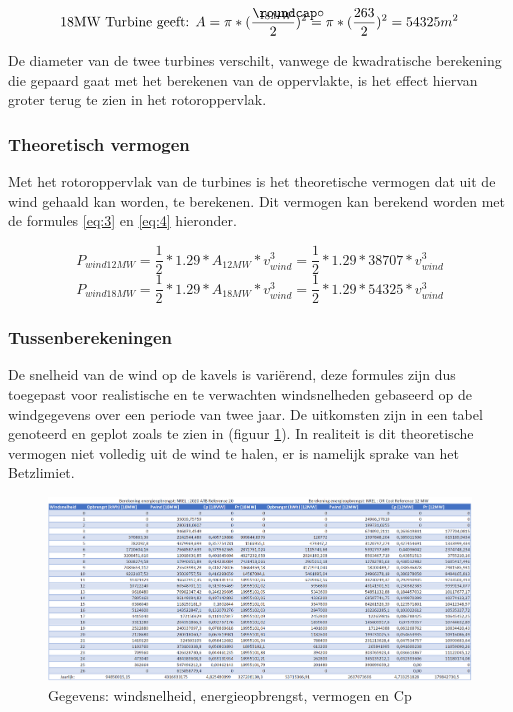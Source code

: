 \begin{equation} \label{eq:2}
\text{18MW Turbine geeft: } A =\pi*(\frac{\slashcirc_{18MW}}{2})^2 = \pi*(\frac{263}{2})^2 = 54325 m^2
\end{equation}

De diameter van de twee turbines verschilt, vanwege de kwadratische berekening die gepaard gaat met het berekenen van de oppervlakte, is het effect hiervan groter terug te zien in het rotoroppervlak.
\subsubsection{Theoretisch vermogen}
Met het rotoroppervlak van de turbines is het theoretische vermogen dat uit de wind gehaald kan worden, te berekenen. Dit vermogen kan berekend worden met de formules \ref{eq:3} en \ref{eq:4} hieronder. 

\begin{equation} \label{eq:3}
    P_{wind12MW} = \frac{1}{2}*1.29*A_{12MW}*v_{wind}^3 = \frac{1}{2}*1.29*38707*v_{wind}^3
\end{equation}
\begin{equation} \label{eq:4}
    P_{wind18MW} = \frac{1}{2}*1.29*A_{18MW}*v_{wind}^3 = \frac{1}{2}*1.29*54325*v_{wind}^3
\end{equation}

\subsubsection{Tussenberekeningen}
De snelheid van de wind op de kavels is variërend, deze formules zijn dus toegepast voor realistische en te verwachten windsnelheden gebaseerd op de windgegevens over een periode van twee jaar.\cite{WindResourceAssessment} 
De uitkomsten zijn in een tabel genoteerd en geplot zoals te zien in (figuur \ref{fig:TVUW}). In realiteit is dit theoretische vermogen niet volledig uit de wind te halen, er is namelijk sprake van het Betzlimiet. 

\begin{figure}[H]
\centering
\includegraphics[width=1\textwidth]{IMG/data/overzicht/TVUW.PNG}
\caption{Gegevens: windsnelheid, energieopbrengst, vermogen en Cp}
\label{fig:TVUW}
\end{figure}

